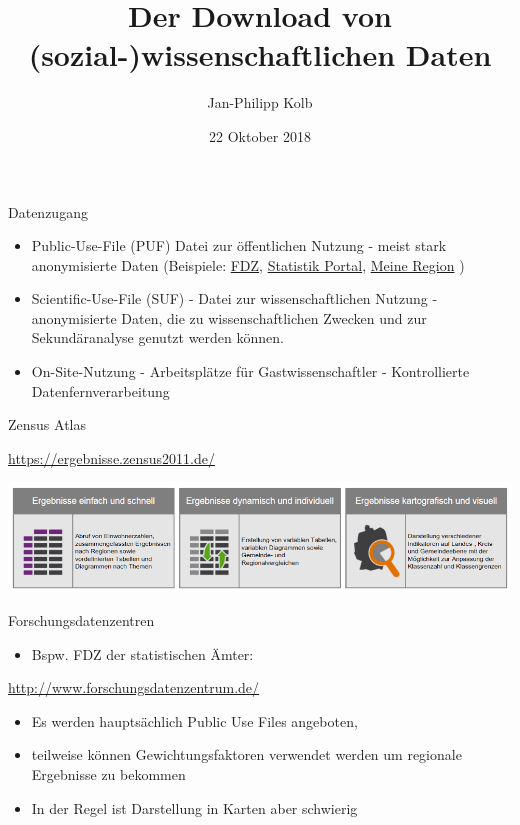 \documentclass[ignorenonframetext,]{beamer}
\title{Der Download von (sozial-)wissenschaftlichen Daten}
\author{Jan-Philipp Kolb}
\date{22 Oktober 2018}
\providecommand{\tightlist}{%
  \setlength{\itemsep}{0pt}\setlength{\parskip}{0pt}}
\begin{document}
\frame{\titlepage}

\begin{frame}{Datenzugang}
\protect\hypertarget{datenzugang}{}

\begin{itemize}
\item
  Public-Use-File (PUF) Datei zur öffentlichen Nutzung - meist stark
  anonymisierte Daten (Beispiele:
  \href{www.forschungsdatenzentrum.de}{FDZ},
  \href{www.statistik-portal.de}{Statistik Portal},
  \href{www.infothek.statistik.rlp.de/lis/MeineRegion/index.asp}{Meine
  Region} )
\item
  Scientific-Use-File (SUF) - Datei zur wissenschaftlichen Nutzung -
  anonymisierte Daten, die zu wissenschaftlichen Zwecken und zur
  Sekundäranalyse genutzt werden können.
\item
  On-Site-Nutzung - Arbeitsplätze für Gastwissenschaftler -
  Kontrollierte Datenfernverarbeitung
\end{itemize}

\end{frame}

\begin{frame}{Zensus Atlas}
\protect\hypertarget{zensus-atlas}{}

\url{https://ergebnisse.zensus2011.de/}

\includegraphics{figure/Zensusdtb.PNG}

\end{frame}

\begin{frame}{Forschungsdatenzentren}
\protect\hypertarget{forschungsdatenzentren}{}

\begin{itemize}
\tightlist
\item
  Bspw. FDZ der statistischen Ämter:
\end{itemize}

\url{http://www.forschungsdatenzentrum.de/}

\begin{itemize}
\item
  Es werden hauptsächlich Public Use Files angeboten,
\item
  teilweise können Gewichtungsfaktoren verwendet werden um regionale
  Ergebnisse zu bekommen
\item
  In der Regel ist Darstellung in Karten aber schwierig
\end{itemize}

\end{frame}
\end{document}
